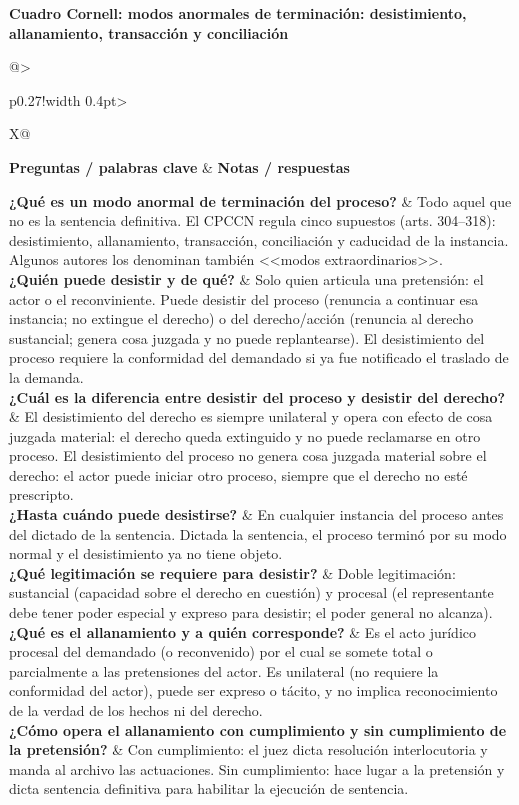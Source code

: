 \documentclass[12pt,oneside]{book}
\makeatletter
\newcommand{\cornelltitle}[1]{\par\bigskip\noindent\textbf{\sffamily Cuadro Cornell: #1}\par\nopagebreak\smallskip}
\newcommand{\cqrow}[2]{\textbf{#1} & #2 \\[0.5em]}
\newcommand{\cornellblock}[1]{%
  \noindent\begin{tabularx}{\textwidth}{@{}>{\raggedright\arraybackslash}p{0.27\textwidth}!{\vrule width 0.4pt}>{\raggedright\arraybackslash}X@{}}
  \toprule
  \textbf{Preguntas / palabras clave} & \textbf{Notas / respuestas} \\
  \midrule
  #1
  \bottomrule
  \end{tabularx}\par}
\makeatother
\begin{document}
\cornelltitle{modos anormales de terminación: desistimiento, allanamiento, transacción y conciliación}
\cornellblock{
\cqrow{¿Qué es un modo anormal de terminación del proceso?}{Todo aquel que no es la sentencia definitiva. El CPCCN regula cinco supuestos (arts. 304--318): desistimiento, allanamiento, transacción, conciliación y caducidad de la instancia. Algunos autores los denominan también <<modos extraordinarios>>.
}
\cqrow{¿Quién puede desistir y de qué?}{Solo quien articula una pretensión: el actor o el reconviniente. Puede desistir del proceso (renuncia a continuar esa instancia; no extingue el derecho) o del derecho/acción (renuncia al derecho sustancial; genera cosa juzgada y no puede replantearse). El desistimiento del proceso requiere la conformidad del demandado si ya fue notificado el traslado de la demanda.
}
\cqrow{¿Cuál es la diferencia entre desistir del proceso y desistir del derecho?}{El desistimiento del derecho es siempre unilateral y opera con efecto de cosa juzgada material: el derecho queda extinguido y no puede reclamarse en otro proceso. El desistimiento del proceso no genera cosa juzgada material sobre el derecho: el actor puede iniciar otro proceso, siempre que el derecho no esté prescripto.
}
\cqrow{¿Hasta cuándo puede desistirse?}{En cualquier instancia del proceso antes del dictado de la sentencia. Dictada la sentencia, el proceso terminó por su modo normal y el desistimiento ya no tiene objeto.
}
\cqrow{¿Qué legitimación se requiere para desistir?}{Doble legitimación: sustancial (capacidad sobre el derecho en cuestión) y procesal (el representante debe tener poder especial y expreso para desistir; el poder general no alcanza).
}
\cqrow{¿Qué es el allanamiento y a quién corresponde?}{Es el acto jurídico procesal del demandado (o reconvenido) por el cual se somete total o parcialmente a las pretensiones del actor. Es unilateral (no requiere la conformidad del actor), puede ser expreso o tácito, y no implica reconocimiento de la verdad de los hechos ni del derecho.
}
\cqrow{¿Cómo opera el allanamiento con cumplimiento y sin cumplimiento de la pretensión?}{Con cumplimiento: el juez dicta resolución interlocutoria y manda al archivo las actuaciones. Sin cumplimiento: hace lugar a la pretensión y dicta sentencia definitiva para habilitar la ejecución de sentencia.
}
}
\medskip
\end{document}
